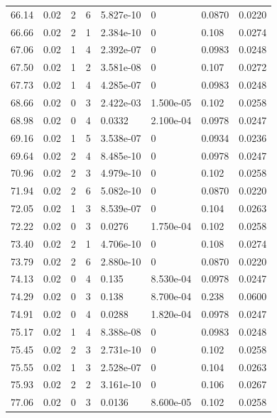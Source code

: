 \documentclass[preview]{standalone}
\begin{document}
{{{\begin{tabular}{L{1.2cm}C{1.2cm} C{0.3cm}C{0.5cm} C{1.4cm}C{1.4cm} C{1.4cm}C{1.4cm}}
  66.14  &  0.02  & 2     &  6 &  5.827e-10  & 0  & 0.0870 &  0.0220   \\ 
  66.66  &  0.02  & 2     &  1 &  2.384e-10  & 0  & 0.108 &  0.0274   \\ 
  67.06  &  0.02  & 1     &  4 &  2.392e-07  & 0  & 0.0983 &  0.0248   \\ 
  67.50  &  0.02  & 1     &  2 &  3.581e-08  & 0  & 0.107 &  0.0272   \\ 
  67.73  &  0.02  & 1     &  4 &  4.285e-07  & 0  & 0.0983 &  0.0248   \\ 
  68.66  &  0.02  & 0     &  3 &  2.422e-03  & 1.500e-05  & 0.102 &  0.0258   \\ 
  68.98  &  0.02  & 0     &  4 &  0.0332  & 2.100e-04  & 0.0978 &  0.0247   \\ 
  69.16  &  0.02  & 1     &  5 &  3.538e-07  & 0  & 0.0934 &  0.0236   \\ 
  69.64  &  0.02  & 2     &  4 &  8.485e-10  & 0  & 0.0978 &  0.0247   \\ 
  70.96  &  0.02  & 2     &  3 &  4.979e-10  & 0  & 0.102 &  0.0258   \\ 
  71.94  &  0.02  & 2     &  6 &  5.082e-10  & 0  & 0.0870 &  0.0220   \\ 
  72.05  &  0.02  & 1     &  3 &  8.539e-07  & 0  & 0.104 &  0.0263   \\ 
  72.22  &  0.02  & 0     &  3 &  0.0276  & 1.750e-04  & 0.102 &  0.0258   \\ 
  73.40  &  0.02  & 2     &  1 &  4.706e-10  & 0  & 0.108 &  0.0274   \\ 
  73.79  &  0.02  & 2     &  6 &  2.880e-10  & 0  & 0.0870 &  0.0220   \\ 
  74.13  &  0.02  & 0     &  4 &  0.135  & 8.530e-04  & 0.0978 &  0.0247   \\ 
  74.29  &  0.02  & 0     &  3 &  0.138  & 8.700e-04  & 0.238 &  0.0600   \\ 
  74.91  &  0.02  & 0     &  4 &  0.0288  & 1.820e-04  & 0.0978 &  0.0247   \\ 
  75.17  &  0.02  & 1     &  4 &  8.388e-08  & 0  & 0.0983 &  0.0248   \\ 
  75.45  &  0.02  & 2     &  3 &  2.731e-10  & 0  & 0.102 &  0.0258   \\ 
  75.55  &  0.02  & 1     &  3 &  2.528e-07  & 0  & 0.104 &  0.0263   \\ 
  75.93  &  0.02  & 2     &  2 &  3.161e-10  & 0  & 0.106 &  0.0267   \\ 
  77.06  &  0.02  & 0     &  3 &  0.0136  & 8.600e-05  & 0.102 &  0.0258   \\ 

\end{tabular}}}}
\end{document}
